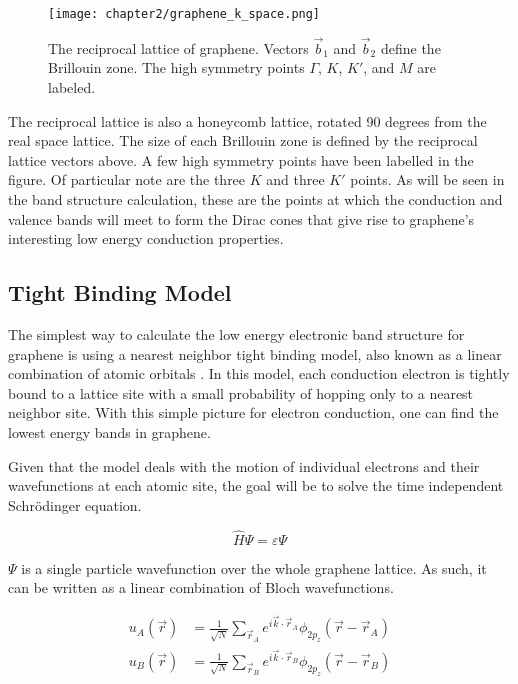 \begin{figure}
    \centering
    \texttt{[image: chapter2/graphene\_k\_space.png]}
    \caption{The reciprocal lattice of graphene. Vectors $\vec{b}_1$ and $\vec{b}_2$ define the Brillouin zone. The high symmetry points $\Gamma$, $K$, $K'$, and $M$ are labeled.}
    \label{fig:graphene_k_space}
\end{figure}

The reciprocal lattice is also a honeycomb lattice, rotated 90 degrees from the real space lattice. The size of each Brillouin zone is defined by the reciprocal lattice vectors above. A few high symmetry points have been labelled in the figure. Of particular note are the three $K$ and three $K'$ points. As will be seen in the band structure calculation, these are the points at which the conduction and valence bands will meet to form the Dirac cones that give rise to graphene's interesting low energy conduction properties.

\subsection{Tight Binding Model}

The simplest way to calculate the low energy electronic band structure for graphene is using a nearest neighbor tight binding model, also known as a linear combination of atomic orbitals \cite{Charlier2007, Ibach2010}. In this model, each conduction electron is tightly bound to a lattice site with a small probability of hopping only to a nearest neighbor site. With this simple picture for electron conduction, one can find the lowest energy bands in graphene.

Given that the model deals with the motion of individual electrons and their wavefunctions at each atomic site, the goal will be to solve the time independent Schr\"{o}dinger equation.

\begin{equation}
    \hat{H}\Psi = \varepsilon\Psi
\end{equation}

$\Psi$ is a single particle wavefunction over the whole graphene lattice. As such, it can be written as a linear combination of Bloch wavefunctions.

\begin{align}
    u_A(\vec{r}) &= \frac{1}{\sqrt{N}}\sum_{\vec{r}_A}^{} e^{i\vec{k}\cdot\vec{r}_A} \phi_{2p_z}(\vec{r}-\vec{r}_A) \\
    u_B(\vec{r}) &= \frac{1}{\sqrt{N}}\sum_{\vec{r}_B}^{} e^{i\vec{k}\cdot\vec{r}_B} \phi_{2p_z}(\vec{r}-\vec{r}_B)
\end{align}


